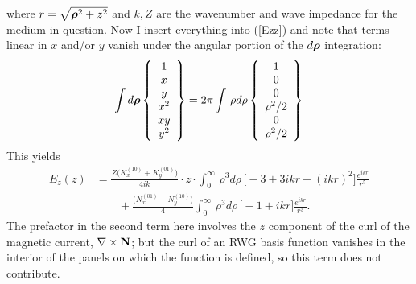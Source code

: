 \documentclass[letterpaper]{article}
\begin{document}
where $r=\sqrt{\boldsymbol{\rho}^2 + z^2}$ and $k,Z$ are the wavenumber and
wave impedance for the medium in question.
Now I insert everything into (\ref{Ezz}) and note that terms linear
in $x$ and/or $y$ vanish under the angular portion of the $d\boldsymbol{\rho}$
integration:
$$ \int d\boldsymbol{\rho} 
   \left\{ \begin{array}{c} 1 \\ x \\ y \\ x^2 \\xy \\y^2 \end{array}
   \right\}
   =2\pi \int \, \rho d\rho 
   \left\{ \begin{array}{c} 1 \\ 0 \\ 0 \\ \rho^2/2 \\ 0 \\ \rho^2/2 \end{array}
   \right\}
$$
This yields
\begin{align*}
 E_z(z) 
&= \frac{Z \big( K_x^{(10)} + K_y^{(01)} \big)}{4ik}  
   \cdot z \cdot \int_0^\infty \, \rho^3 d\rho \, \big[-3 + 3ikr - (ikr)^2\big] 
   \frac{e^{ikr}}{r^5}
\\
&\qquad
 + \frac{\big( N_x^{(01)} - N_y^{(10)} \big)}{4}  
   \int_0^\infty \, \rho^3 d\rho \, \big[-1 + ikr ] 
   \frac{e^{ikr}}{r^3}.
\end{align*}
The prefactor in the second term here involves the $z$ component of the 
curl of the magnetic current, $\nabla \times \mathbf{N}$; but the curl of an 
RWG basis function vanishes in the interior of the panels on which the 
function is defined, so this term does not contribute.
\end{document}
